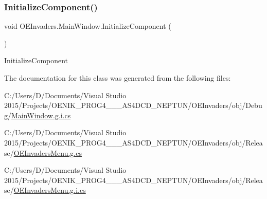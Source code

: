 \subsubsection{\texorpdfstring{InitializeComponent()}{InitializeComponent()}\hspace{0.1cm}{\footnotesize\ttfamily [3/3]}}
{\footnotesize\ttfamily void O\+E\+Invaders.\+Main\+Window.\+Initialize\+Component (\begin{DoxyParamCaption}{ }\end{DoxyParamCaption})}



Initialize\+Component 



The documentation for this class was generated from the following files\+:\begin{DoxyCompactItemize}
\item 
C\+:/\+Users/\+D/\+Documents/\+Visual Studio 2015/\+Projects/\+O\+E\+N\+I\+K\+\_\+\+P\+R\+O\+G4\+\_\+\_\+\_\+\+A\+S4\+D\+C\+D\+\_\+\+N\+E\+P\+T\+U\+N/\+O\+E\+Invaders/obj/\+Debug/\mbox{\hyperlink{_main_window_8g_8i_8cs}{Main\+Window.\+g.\+i.\+cs}}\item 
C\+:/\+Users/\+D/\+Documents/\+Visual Studio 2015/\+Projects/\+O\+E\+N\+I\+K\+\_\+\+P\+R\+O\+G4\+\_\+\_\+\_\+\+A\+S4\+D\+C\+D\+\_\+\+N\+E\+P\+T\+U\+N/\+O\+E\+Invaders/obj/\+Release/\mbox{\hyperlink{_release_2_o_e_invaders_menu_8g_8cs}{O\+E\+Invaders\+Menu.\+g.\+cs}}\item 
C\+:/\+Users/\+D/\+Documents/\+Visual Studio 2015/\+Projects/\+O\+E\+N\+I\+K\+\_\+\+P\+R\+O\+G4\+\_\+\_\+\_\+\+A\+S4\+D\+C\+D\+\_\+\+N\+E\+P\+T\+U\+N/\+O\+E\+Invaders/obj/\+Release/\mbox{\hyperlink{_release_2_o_e_invaders_menu_8g_8i_8cs}{O\+E\+Invaders\+Menu.\+g.\+i.\+cs}}\end{DoxyCompactItemize}
